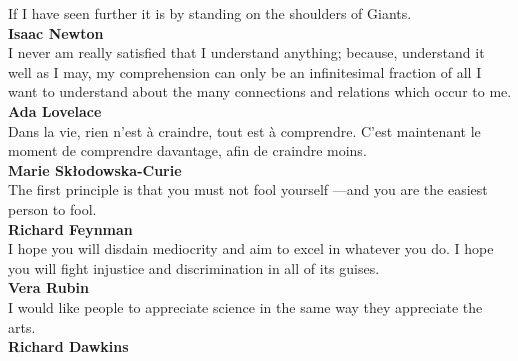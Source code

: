 \cleardoublepage\thispagestyle{empty}
\vspace{10cm}\hspace{5cm}
\parbox{12cm}{\sffamily\Large
	If I have seen further it is by standing on the shoulders of Giants.\\[10pt]
	\textbf{Isaac Newton}\\[35pt]
	I never am really satisfied that I understand anything; because, understand it well as I may, my comprehension can only be an infinitesimal fraction of all I want to understand about the many connections and relations which occur to me.\\[10pt]
	\textbf{Ada Lovelace}\\[35pt]
	Dans la vie, rien n'est à craindre, tout est à comprendre. C'est maintenant le moment de comprendre davantage, afin de craindre moins.\\[10pt]
	\textbf{Marie Skłodowska-Curie}\\[35pt]
	The first principle is that you must not fool yourself ---and you are the easiest person to fool.\\[10pt]
	\textbf{Richard Feynman}\\[35pt]
	I hope you will disdain mediocrity and aim to excel in whatever you do. I hope you will fight injustice and discrimination in all of its guises.\\[10pt]
	\textup{\textbf{Vera Rubin}}\\[35pt]
	I would like people to appreciate science in the same way they appreciate the arts.\\[10pt]
	\textbf{Richard Dawkins}}
